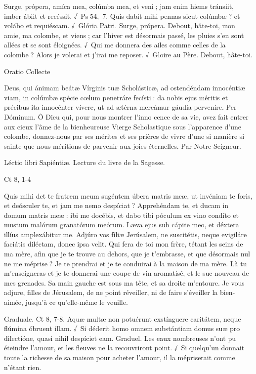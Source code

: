 \begin{paracol}{2}
Surge, própera, amíca mea, colúmba  mea, et veni ; jam enim hiems tránsiit, imber ábiit et recéssit. √~Ps 54, 7. Quis dabit mihi pennas sicut colúmbæ ? et volábo et requiéscam. √~Glória Patri. Surge, própera.
\switchcolumn
Debout, hâte-toi, mon amie, ma colombe, et viens ; car l’hiver est désormais passé, les pluies s’en sont allées et se sont éloignées. √~Qui me donnera des ailes comme celles de la colombe ? Alors je volerai et j’irai me reposer. √~Gloire au Père. Debout, hâte-toi.
\switchcolumn*

Oratio
\switchcolumn
Collecte
\switchcolumn*

Deus, qui ánimam beátæ Vírginis  tuæ Scholásticæ, ad ostendéndam innocéntiæ viam, in colúmbæ spécie cœlum penetráre fecísti : da nobis ejus méritis et précibus ita innocénter vívere, ut ad ætérna mereámur gáudia perveníre. Per Dóminum.
\switchcolumn
Ô Dieu qui, pour nous montrer l’inno cence de sa vie, avez fait entrer aux cieux l’âme de la bienheureuse Vierge Scholastique sous l’apparence d’une colombe, donnez-nous  par ses mérites et ses prières de vivre d’une si manière si sainte que nous méritions de parvenir aux joies éternelles. Par Notre-Seigneur.
\switchcolumn*

Léctio libri Sapiéntiæ.
\switchcolumn
Lecture du livre de la Sagesse.
\switchcolumn*

Ct 8, 1-4
\switchcolumn

\switchcolumn*

Quis mihi det te fratrem meum  sugéntem úbera matris meæ, ut invéniam te foris, et deósculer te, et jam me nemo despíciat ? Apprehéndam te, et ducam in domum matris meæ : ibi me docébis, et dabo tibi póculum ex vino condíto et mustum malórum granatórum meórum. Læva ejus sub cápite meo, et déxtera illíus amplexábitur me. Adjúro vos fíliæ Jerúsalem, ne suscitétis, neque evigiláre faciátis diléctam, donec ipsa velit.
\switchcolumn
Qui fera de toi mon frère, tétant les seins  de ma mère, afin que je te trouve au dehors, que je t’embrasse, et que désormais nul ne me méprise ? Je te prendrai et je te conduirai à la maison de ma mère. Là tu m’enseigneras et je te donnerai une coupe de vin aromatisé, et le suc nouveau de mes grenades. Sa main gauche est sous ma tête, et sa droite m’entoure. Je vous adjure, filles de Jérusalem, de ne point réveiller, ni de faire s’éveiller la bien-aimée, jusqu’à ce qu’elle-même le veuille.
\switchcolumn*

Graduale. Ct 8, 7-8. Aquæ multæ non potuérunt exstínguere caritátem, neque flúmina óbruent illam. √~Si déderit homo omnem substántiam domus suæ pro dilectióne, quasi nihil despíciet eam.
\switchcolumn
Graduel. Les eaux nombreuses n’ont pu éteindre l’amour, et les fleuves ne la recouvriront point. √~Si quelqu’un donnait toute la richesse de sa maison pour acheter l’amour, il la mépriserait comme n’étant rien.
\switchcolumn*


\end{paracol}
